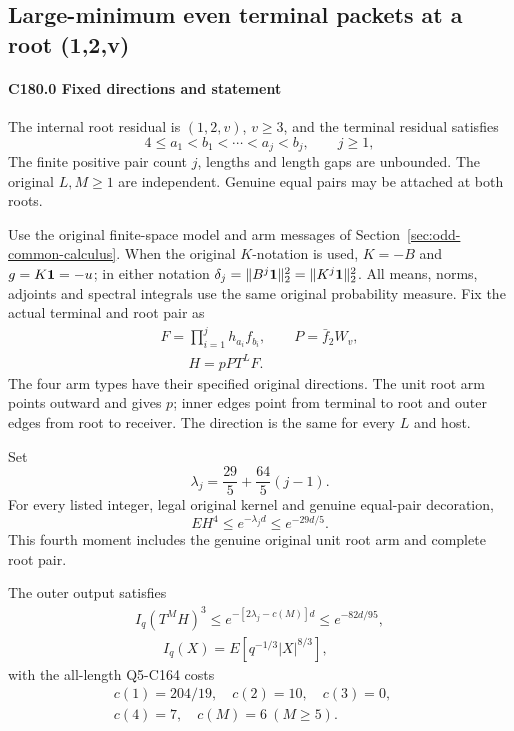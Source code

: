 \subsection{Large-minimum even terminal packets at a root (1,2,v)}\label{proof:Q5-C180}
\paragraph{C180.0 Fixed directions and statement}



The internal root residual is \((1,\allowbreak \allowbreak  2,\allowbreak \allowbreak  v)\), \(v\ge3\), and the terminal residual satisfies
\[
 4\le a_1<b_1<\cdots<a_j<b_j,\qquad j\ge1,              \tag{C180.1}
\]
The finite positive pair count \(j\), lengths and length gaps are unbounded. The original \(L,\allowbreak \allowbreak  M\ge1\) are independent. Genuine equal pairs may be attached at both roots.

Use the original finite-space model and arm messages of
Section~\ref{sec:odd-common-calculus}.
When the original \(K\)-notation is used, \(K=-B\) and
\(g=K\mathbf1=-u\); in either notation
\(\delta_j=\|B^j\mathbf1\|_2^2=\|K^j\mathbf1\|_2^2\).
All means, norms, adjoints and spectral integrals use the same
original probability measure.
Fix the actual terminal and root pair as
\[
\begin{gathered}
F=\prod_{i=1}^j h_{a_i}f_{b_i},\qquad P=\bar f_2W_v,\\
\qquad H=pP T^LF.
\end{gathered}\tag{C180.2}
\]
\label{part:C180:dirs}The four arm types have their specified original directions. The unit root arm points outward and gives \(p\); inner edges point from terminal to root and outer edges from root to receiver. The direction is the same for every \(L\) and host.

Set
\[
 \lambda_j=\frac{29}{5}+\frac{64}{5}(j-1).
\]
For every listed integer, legal original kernel and genuine equal-pair decoration,
\[
 \boxed{EH^4\le e^{-\lambda_jd}\le e^{-29d/5}.}          \tag{C180.3}
\]
This fourth moment includes the genuine original unit root arm and complete root pair.

The outer output satisfies
\[
\begin{gathered}
I_q(T^MH)^3\le e^{-[2\lambda_j-c(M)]d}\le e^{-82d/95},\\
\qquad I_q(X)=E[q^{-1/3}|X|^{8/3}],
\end{gathered}\tag{C180.4}
\]
with the all-length Q5-C164 costs
\[
\begin{gathered}
c(1)=204/19,\quad c(2)=10,\quad c(3)=0,\quad\\
c(4)=7,\quad c(M)=6\ (M\ge5).
\end{gathered}\tag{C180.5}
\]

